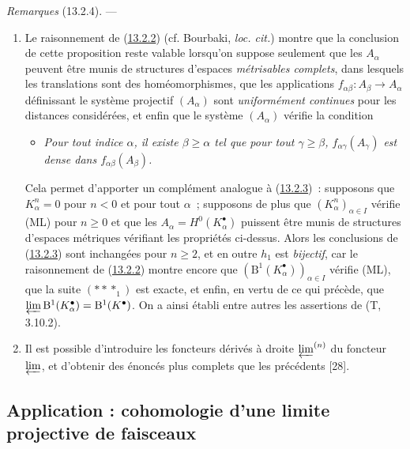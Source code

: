 \begin{env}[13.2.4]
\label{0.13.2.4-fr}
\emph{Remarques} (13.2.4). ---
\begin{enumerate}
\item[(i)]
Le raisonnement de (\hyperref[0.13.2.2-fr]{13.2.2}) (cf. Bourbaki,
\emph{loc. cit.}) montre que la conclusion de cette proposition reste
valable lorsqu'on suppose seulement que les $A_\alpha$ peuvent être munis
de structures d'espaces \emph{métrisables complets}, dans lesquels les
translations sont des homéomorphismes, que les applications
$f_{\alpha\beta}:A_\beta\to A_\alpha$ définissant le système projectif
$(A_\alpha)$ sont \emph{uniformément continues} pour les distances
considérées, et enfin que le système $(A_\alpha)$ vérifie la condition
\begin{itemize}
\item[(ML$'$)]
\emph{Pour tout indice $\alpha$, il existe $\beta\geq\alpha$ tel que pour
tout $\gamma\geq\beta$, $f_{\alpha\gamma}(A_\gamma)$ est dense dans
$f_{\alpha\beta}(A_\beta)$.}
\end{itemize}

Cela permet d'apporter un complément analogue à
(\hyperref[0.13.2.3-fr]{13.2.3})~: supposons que
$K_\alpha^n=0$ pour $n<0$ et pour tout $\alpha$~; supposons de plus que
$(K_\alpha^n)_{\alpha\in I}$ vérifie (ML) pour $n\geq0$ et que les
$A_\alpha=H^0(K_\alpha^\bullet)$ puissent être munis de structures
d'espaces métriques vérifiant les propriétés ci-dessus. Alors les
conclusions de (\hyperref[0.13.2.3-fr]{13.2.3}) sont inchangées pour
$n\geq2$, et en outre $h_1$ est \emph{bijectif}, car le raisonnement de
(\hyperref[0.13.2.2-fr]{13.2.2}) montre encore que
$(\mathrm B^1(K_\alpha^\bullet))_{\alpha\in I}$ vérifie (ML), que la suite
$(***_1)$ est exacte, et enfin, en vertu de ce qui précède, que
$\varprojlim\mathrm B^1(K_\alpha^\bullet)=\mathrm B^1(K^\bullet)$. On a
ainsi établi entre autres les assertions de (T, 3.10.2).

\item[(ii)]
Il est possible d'introduire les foncteurs dérivés à droite
$\varprojlim^{(n)}$ du foncteur $\varprojlim$, et d'obtenir des énoncés
plus complets que les précédents [28].
\end{enumerate}
\end{env}

\subsection{Application : cohomologie d'une limite projective de faisceaux}
\label{subsection:0.13.3-fr}

